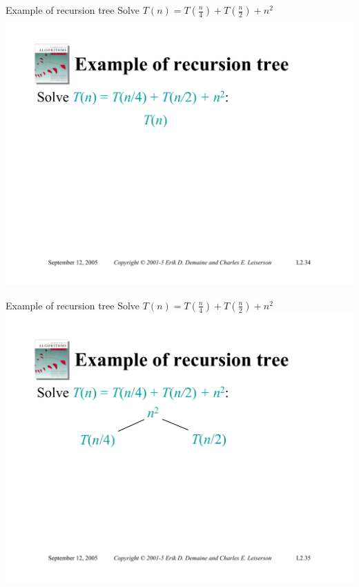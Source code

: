 \documentclass{beamer}
\begin{document}
\begin{frame}{Example of recursion tree}
    Solve $T(n) = T\left(\frac{n}{4}\right) + T\left(\frac{n}{2}\right) + n^2$
    \includegraphics[width=\textwidth, trim={1.10cm 1.20cm 0.30cm 5.75cm}, clip]{pages/lec2_34}
\end{frame}
\begin{frame}{Example of recursion tree}
    Solve $T(n) = T\left(\frac{n}{4}\right) + T\left(\frac{n}{2}\right) + n^2$
    \includegraphics[width=\textwidth, trim={1.10cm 1.20cm 0.30cm 5.75cm}, clip]{pages/lec2_35}
\end{frame}
\end{document}
